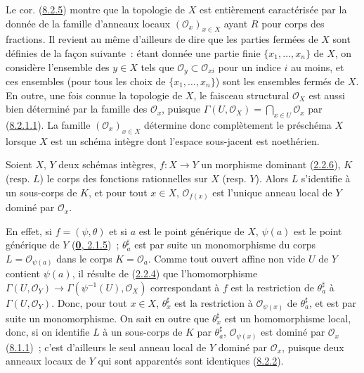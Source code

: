 \begin{env}[8.2.6]
\label{I.8.2.6-fr}
Le cor. (\hyperref[I.8.2.5-fr]{8.2.5}) montre que la topologie de $X$ est
entièrement caractérisée par la donnée de la famille d'anneaux locaux
$(\mathscr{O}_x)_{x\in X}$ ayant $R$ pour corps des fractions. Il revient au
même d'ailleurs de dire que les parties fermées de $X$ sont définies de la
façon suivante~: étant donnée une partie finie
$\{x_1,\ldots,x_n\}$ de $X$, on considère l'ensemble des $y\in X$ tels que
$\mathscr{O}_y\subset\mathscr{O}_{xi}$ pour un indice $i$ au moins, et ces
ensembles (pour tous les choix de $\{x_1,\ldots,x_n\}$) sont les ensembles
fermés de $X$. En outre, une fois connue la topologie de $X$, le faisceau
structural $\mathscr{O}_X$ est aussi bien déterminé par la famille des
$\mathscr{O}_x$, puisque
$\Gamma(U,\mathscr{O}_X)=\bigcap_{x\in U}\mathscr{O}_x$
par (\hyperref[I.8.2.1.1-fr]{8.2.1.1}). La famille
$(\mathscr{O}_x)_{x\in X}$ détermine donc complètement le préschéma $X$
lorsque $X$ est un schéma intègre dont l'espace sous-jacent est noethérien.
\end{env}

\begin{proposition}[8.2.7]
\label{I.8.2.7-fr}
Soient $X$, $Y$ deux schémas intègres, $f:X\to Y$ un morphisme dominant
\textup{(\hyperref[I.2.2.6-fr]{2.2.6})}, $K$ \textup{(resp. $L$)} le corps des fonctions
rationnelles sur $X$ \textup{(resp. $Y$)}. Alors $L$ s'identifie à un sous-corps de
$K$, et pour tout $x\in X$, $\mathscr{O}_{f(x)}$ est l'unique anneau local de
$Y$ dominé par $\mathscr{O}_x$.
\end{proposition}

En effet, si $f=(\psi,\theta)$ et si $a$ est le point générique de $X$,
$\psi(a)$ est le point générique de $Y$
(\hyperref[0.2.1.5-fr]{\textbf{0}, 2.1.5})~; $\theta_a^\sharp$ est par suite un
monomorphisme du corps $L=\mathscr{O}_{\psi(a)}$ dans le corps
$K=\mathscr{O}_a$. Comme tout ouvert affine non vide $U$ de $Y$ contient
$\psi(a)$, il résulte de (\hyperref[I.2.2.4-fr]{2.2.4}) que l'homomorphisme
$\Gamma(U,\mathscr{O}_Y)\to\Gamma(\psi^{-1}(U),\mathscr{O}_X)$ correspondant
à $f$ est la restriction de $\theta_a^\sharp$ à
$\Gamma(U,\mathscr{O}_Y)$. Donc, pour tout $x\in X$,
$\theta_x^\sharp$ est la restriction à $\mathscr{O}_{\psi(x)}$ de
$\theta_a^\sharp$, et est par suite un monomorphisme. On sait en outre que
$\theta_x^\sharp$ est un homomorphisme local, donc, si on identifie $L$ à un
sous-corps de $K$ par $\theta_a^\sharp$, $\mathscr{O}_{\psi(x)}$ est dominé
par $\mathscr{O}_x$ (\hyperref[I.8.1.1-fr]{8.1.1})~; c'est d'ailleurs le seul
anneau local de $Y$ dominé par $\mathscr{O}_x$, puisque deux anneaux locaux de
$Y$ qui sont apparentés sont identiques
(\hyperref[I.8.2.2-fr]{8.2.2}).

